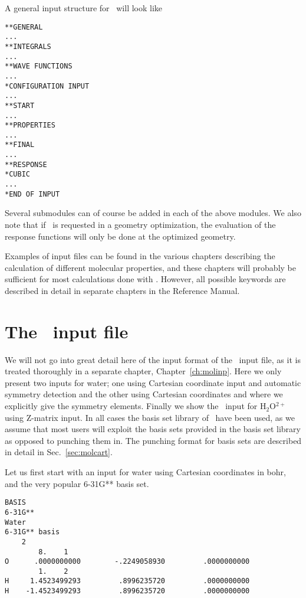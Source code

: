 A general input structure for \siraba\ will look like

\begin{verbatim}
**GENERAL
...
**INTEGRALS
...
**WAVE FUNCTIONS
...
*CONFIGURATION INPUT
...
**START
...
**PROPERTIES
...
**FINAL
...
**RESPONSE
*CUBIC
...
*END OF INPUT
\end{verbatim}

Several submodules can of course be added in each of the above
modules. We also note that if \resp\ is requested in a geometry
optimization, the evaluation of the response functions will only be
done at the optimized geometry.

Examples of input files can be found in the various chapters
describing the calculation of different molecular properties, and
these chapters will probably be sufficient for most calculations done
with \siraba . However, all possible keywords are described in detail
in separate chapters in the Reference Manual.

\section{The \mol\ input file}

We will not go into great detail here of the input format of the \mol\ input
file, as it is treated thoroughly in a separate chapter,
Chapter~\ref{ch:molinp}. Here we only present two inputs for
water; one
using Cartesian coordinate input and
automatic symmetry detection and
the other using Cartesian coordinates and where we explicitly give the
symmetry elements. Finally we show the \mol\ input for H$_{2}$O$^{2+}$
using Z-matrix input. In
all cases the basis set library of \siraba\ have been used, as we
assume that most users will exploit the basis sets provided in the basis
set library as opposed to punching them in. The punching
format for basis sets are described in detail in Sec.~\ref{sec:molcart}.

Let us first start with an input for water using Cartesian coordinates in bohr,
and the very popular 6-31G** basis set.

\begin{verbatim}
BASIS
6-31G**
Water
6-31G** basis
    2
        8.    1
O      .0000000000        -.2249058930         .0000000000
        1.    2
H     1.4523499293         .8996235720         .0000000000
H    -1.4523499293         .8996235720         .0000000000
\end{verbatim}

